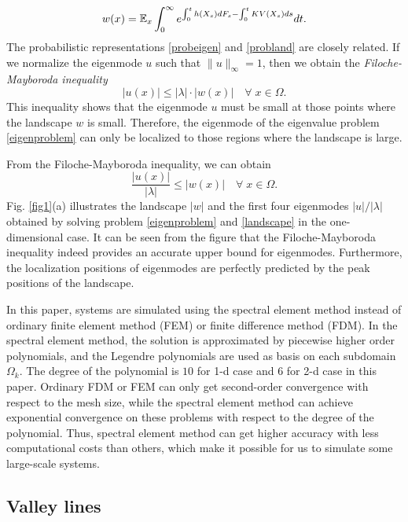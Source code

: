 \documentclass[a4paper,11pt]{article}
\begin{document}
\begin{equation}\label{probland}
w(x) = \mathbb{E}_x \int_{0}^{\infty} e^{\int_{0}^{t} h(X_s) d F_s - \int_{0}^{t} KV(X_s) ds} dt.
\end{equation}
The probabilistic representations \eqref{probeigen} and \eqref{probland} are closely related. If we normalize the eigenmode $u$ such that $\|u\|_\infty = 1$, then we obtain the \emph{Filoche-Mayboroda inequality}
\begin{equation*}
|u(x)| \leq |\lambda| \cdot |w(x)| \quad \forall \; x \in \Omega.
\end{equation*}
This inequality shows that the eigenmode $u$ must be small at those points where the landscape $w$ is small. Therefore, the eigenmode of the eigenvalue problem \eqref{eigenproblem} can only be localized to those regions where the landscape is large.

From the Filoche-Mayboroda inequality, we can obtain
\begin{equation*}
\frac{|u(x)|}{|\lambda|} \leq |w(x)| \quad \forall \; x \in \Omega.
\end{equation*}
Fig. \ref{fig1}(a) illustrates the landscape $|w|$ and the first four eigenmodes $|u| / |\lambda|$ obtained by solving problem \eqref{eigenproblem} and \eqref{landscape} in the one-dimensional case. It can be seen from the figure that the Filoche-Mayboroda inequality indeed provides an accurate upper bound for eigenmodes. Furthermore, the localization positions of eigenmodes are perfectly predicted by the peak positions of the landscape.

In this paper, systems are simulated using the spectral element method instead of ordinary finite element method (FEM) or finite difference method (FDM). In the spectral element method, the solution is approximated by piecewise higher order polynomials, and the Legendre polynomials are used as basis on each subdomain  $\Omega_k$. The degree of the polynomial is $10$ for 1-d case and $6$ for 2-d case in this paper. Ordinary FDM or FEM can only get second-order convergence with respect to the mesh size, while the spectral element method can achieve exponential convergence on these problems with respect to the degree of the polynomial. Thus, spectral element method can get higher accuracy with less computational costs than others, which make it possible for us to simulate some large-scale systems.

\subsection{Valley lines}
\end{document}
